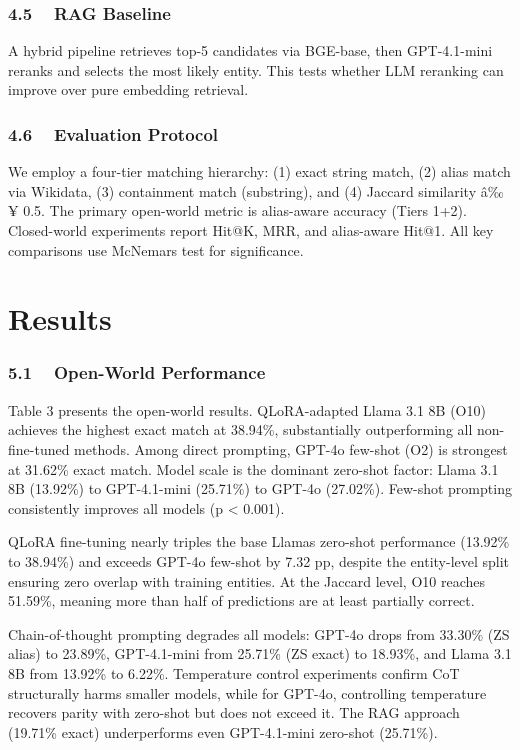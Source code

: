 ﻿\documentclass{article}
\begin{document}
\subsubsection{4.5 ~ RAG Baseline}\label{rag-baseline}

A hybrid pipeline retrieves top-5 candidates via BGE-base, then
GPT-4.1-mini reranks and selects the most likely entity. This tests
whether LLM reranking can improve over pure embedding retrieval.

\subsubsection{4.6 ~ Evaluation Protocol}\label{evaluation-protocol}

We employ a four-tier matching hierarchy: (1) exact string match, (2)
alias match via Wikidata, (3) containment match (substring), and (4)
Jaccard similarity â‰¥ 0.5. The primary open-world metric is alias-aware
accuracy (Tiers 1+2). Closed-world experiments report Hit@K, MRR, and
alias-aware Hit@1. All key comparisons use McNemar\textquotesingle s
test for significance.

\section{Results}\label{results}

\subsubsection{5.1 ~ Open-World
Performance}\label{open-world-performance}

Table 3 presents the open-world results. QLoRA-adapted Llama 3.1 8B
(O10) achieves the highest exact match at 38.94\%, substantially
outperforming all non-fine-tuned methods. Among direct prompting, GPT-4o
few-shot (O2) is strongest at 31.62\% exact match. Model scale is the
dominant zero-shot factor: Llama 3.1 8B (13.92\%) to GPT-4.1-mini
(25.71\%) to GPT-4o (27.02\%). Few-shot prompting consistently improves
all models (p \textless{} 0.001).

QLoRA fine-tuning nearly triples the base Llama\textquotesingle s
zero-shot performance (13.92\% to 38.94\%) and exceeds GPT-4o few-shot
by 7.32 pp, despite the entity-level split ensuring zero overlap with
training entities. At the Jaccard level, O10 reaches 51.59\%, meaning
more than half of predictions are at least partially correct.

Chain-of-thought prompting degrades all models: GPT-4o drops from
33.30\% (ZS alias) to 23.89\%, GPT-4.1-mini from 25.71\% (ZS exact) to
18.93\%, and Llama 3.1 8B from 13.92\% to 6.22\%. Temperature control
experiments confirm CoT structurally harms smaller models, while for
GPT-4o, controlling temperature recovers parity with zero-shot but does
not exceed it. The RAG approach (19.71\% exact) underperforms even
GPT-4.1-mini zero-shot (25.71\%).
\end{document}
